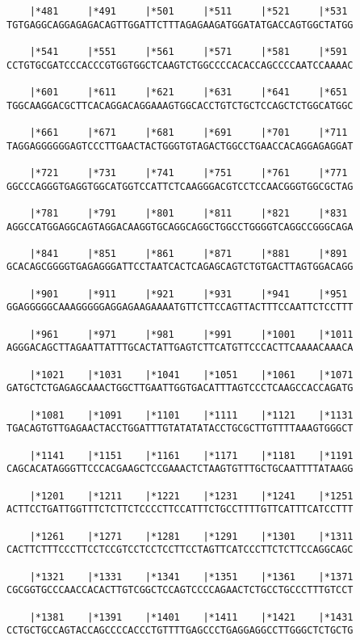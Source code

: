 \documentclass{article}
\begin{document}
\begin{Verbatim}
    |*481     |*491     |*501     |*511     |*521     |*531 
TGTGAGGCAGGAGAGACAGTTGGATTCTTTAGAGAAGATGGATATGACCAGTGGCTATGG
  
    |*541     |*551     |*561     |*571     |*581     |*591 
CCTGTGCGATCCCACCCGTGGTGGCTCAAGTCTGGCCCCACACCAGCCCCAATCCAAAAC
  
    |*601     |*611     |*621     |*631     |*641     |*651 
TGGCAAGGACGCTTCACAGGACAGGAAAGTGGCACCTGTCTGCTCCAGCTCTGGCATGGC
  
    |*661     |*671     |*681     |*691     |*701     |*711 
TAGGAGGGGGGAGTCCCTTGAACTACTGGGTGTAGACTGGCCTGAACCACAGGAGAGGAT
  
    |*721     |*731     |*741     |*751     |*761     |*771 
GGCCCAGGGTGAGGTGGCATGGTCCATTCTCAAGGGACGTCCTCCAACGGGTGGCGCTAG
  
    |*781     |*791     |*801     |*811     |*821     |*831 
AGGCCATGGAGGCAGTAGGACAAGGTGCAGGCAGGCTGGCCTGGGGTCAGGCCGGGCAGA
  
    |*841     |*851     |*861     |*871     |*881     |*891 
GCACAGCGGGGTGAGAGGGATTCCTAATCACTCAGAGCAGTCTGTGACTTAGTGGACAGG
  
    |*901     |*911     |*921     |*931     |*941     |*951 
GGAGGGGGCAAAGGGGGAGGAGAAGAAAATGTTCTTCCAGTTACTTTCCAATTCTCCTTT
  
    |*961     |*971     |*981     |*991     |*1001    |*1011
AGGGACAGCTTAGAATTATTTGCACTATTGAGTCTTCATGTTCCCACTTCAAAACAAACA
  
    |*1021    |*1031    |*1041    |*1051    |*1061    |*1071
GATGCTCTGAGAGCAAACTGGCTTGAATTGGTGACATTTAGTCCCTCAAGCCACCAGATG
  
    |*1081    |*1091    |*1101    |*1111    |*1121    |*1131
TGACAGTGTTGAGAACTACCTGGATTTGTATATATACCTGCGCTTGTTTTAAAGTGGGCT
  
    |*1141    |*1151    |*1161    |*1171    |*1181    |*1191
CAGCACATAGGGTTCCCACGAAGCTCCGAAACTCTAAGTGTTTGCTGCAATTTTATAAGG
  
    |*1201    |*1211    |*1221    |*1231    |*1241    |*1251
ACTTCCTGATTGGTTTCTCTTCTCCCCTTCCATTTCTGCCTTTTGTTCATTTCATCCTTT
  
    |*1261    |*1271    |*1281    |*1291    |*1301    |*1311
CACTTCTTTCCCTTCCTCCGTCCTCCTCCTTCCTAGTTCATCCCTTCTCTTCCAGGCAGC
  
    |*1321    |*1331    |*1341    |*1351    |*1361    |*1371
CGCGGTGCCCAACCACACTTGTCGGCTCCAGTCCCCAGAACTCTGCCTGCCCTTTGTCCT
  
    |*1381    |*1391    |*1401    |*1411    |*1421    |*1431
CCTGCTGCCAGTACCAGCCCCACCCTGTTTTGAGCCCTGAGGAGGCCTTGGGCTCTGCTG
  

\end{Verbatim}
\end{document}
